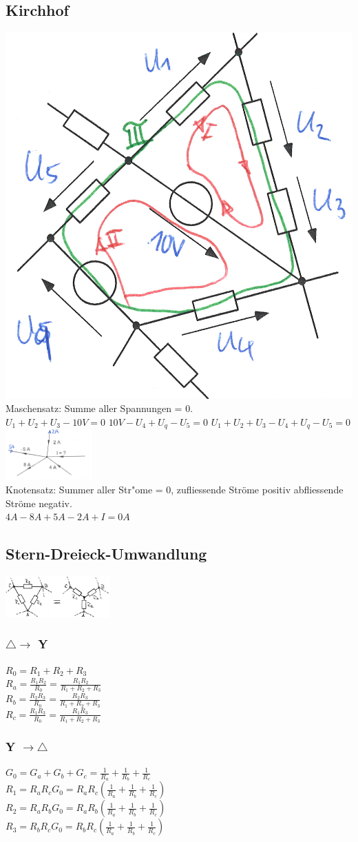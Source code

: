 \subsection{Kirchhof}
\begin{multicols}{4}
\includegraphics[width=0.15 \textwidth]{pics/kirchhof/masche}\\
Maschensatz: Summe aller Spannungen = 0.\\
	$U_1+U_2+U_3-10V=0$
	$10V-U_4+U_q-U_5=0$
	$U_1+U_2+U_3-U_4+U_q-U_5=0$\\
\includegraphics[width=0.25\textwidth]{pics/kirchhof/knoten}\\
Knotensatz: Summer aller Str"ome = 0, zufliessende Ströme positiv abfliessende Ströme negativ.\\
$4A-8A+5A-2A+I=0A$\\
\end{multicols}

\subsection{Stern-Dreieck-Umwandlung}
\begin{multicols}{3}
\includegraphics[width=0.3\textwidth]{pics/stern-dreieck}
\subsubsection{$ \triangle \rightarrow $ Y}
$ R_0 = R_1 + R_2 + R_3 $ \\
$ R_a = \frac{R_1R_2}{R_0} = \frac{R_1R_2}{R_1 + R_2 + R_3} $ \\
$ R_b = \frac{R_2R_3}{R_0} = \frac{R_2R_3}{R_1 + R_2 + R_3} $ \\
$ R_c = \frac{R_1R_3}{R_0} = \frac{R_1R_3}{R_1 + R_2 + R_3} $ \\
\subsubsection{Y $ \rightarrow \triangle $}
$ G_0 = G_a + G_b + G_c = \frac{1}{R_a} + \frac{1}{R_b} + \frac{1}{R_c} $ \\
$ R_1 = R_aR_cG_0 = R_aR_c(\frac{1}{R_a} + \frac{1}{R_b} + \frac{1}{R_c}) $ \\
$ R_2 = R_aR_bG_0 = R_aR_b(\frac{1}{R_a} + \frac{1}{R_b} + \frac{1}{R_c}) $ \\
$ R_3 = R_bR_cG_0 = R_bR_c(\frac{1}{R_a} + \frac{1}{R_b} + \frac{1}{R_c}) $ \\
\end{multicols}

